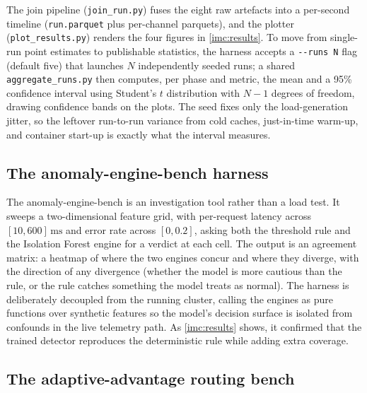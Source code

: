 The join pipeline (\texttt{join\_run.py}) fuses the eight raw artefacts into a
per-second timeline (\texttt{run.parquet} plus per-channel parquets), and the plotter
(\texttt{plot\_results.py}) renders the four figures in \cref{imc:results}. To move
from single-run point estimates to publishable statistics, the harness accepts a
\texttt{-{}-runs N} flag (default five) that launches $N$ independently seeded runs; a
shared \texttt{aggregate\_runs.py} then computes, per phase and metric, the mean and a
95\% confidence interval using Student's $t$ distribution with $N-1$ degrees of
freedom, drawing confidence bands on the plots. The seed fixes only the
load-generation jitter, so the leftover run-to-run variance from cold caches,
just-in-time warm-up, and container start-up is exactly what the interval measures.

\subsection{The anomaly-engine-bench harness}\label{imc:anomalybench}

The anomaly-engine-bench is an investigation tool rather than a load test. It sweeps a
two-dimensional feature grid, with per-request latency across $[10, 600]\,\text{ms}$
and error rate across $[0, 0.2]$, asking both the threshold rule and the Isolation
Forest engine for a verdict at each cell. The output is an agreement matrix: a heatmap
of where the two engines concur and where they diverge, with the direction of any
divergence (whether the model is more cautious than the rule, or the rule catches
something the model treats as normal). The harness is deliberately decoupled from the
running cluster, calling the engines as pure functions over synthetic features so the
model's decision surface is isolated from confounds in the live telemetry path. As
\cref{imc:results} shows, it confirmed that the trained detector reproduces the
deterministic rule while adding extra coverage.

\subsection{The adaptive-advantage routing bench}\label{imc:routingbench}


